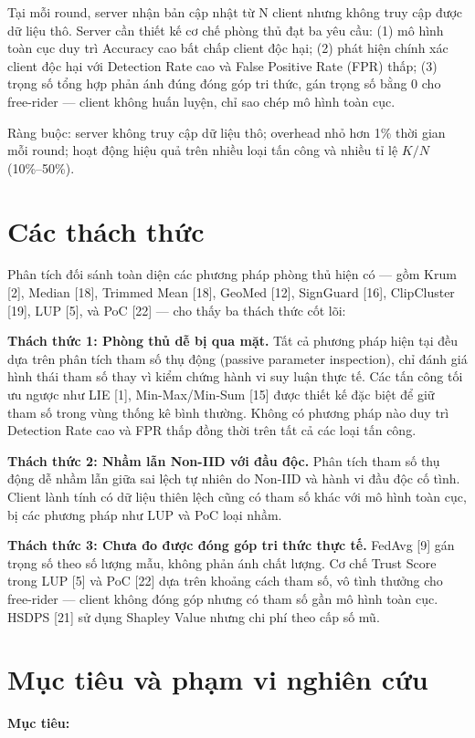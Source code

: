 Tại mỗi round, server nhận bản cập nhật từ N client nhưng không truy cập được dữ liệu thô. Server cần thiết kế cơ chế phòng thủ đạt ba yêu cầu: (1) mô hình toàn cục duy trì Accuracy cao bất chấp client độc hại; (2) phát hiện chính xác client độc hại với Detection Rate cao và False Positive Rate (FPR) thấp; (3) trọng số tổng hợp phản ánh đúng đóng góp tri thức, gán trọng số bằng 0 cho free-rider --- client không huấn luyện, chỉ sao chép mô hình toàn cục.

Ràng buộc: server không truy cập dữ liệu thô; overhead nhỏ hơn 1\% thời gian mỗi round; hoạt động hiệu quả trên nhiều loại tấn công và nhiều tỉ lệ $K/N$ (10\%--50\%).

\section{Các thách thức}
Phân tích đối sánh toàn diện các phương pháp phòng thủ hiện có --- gồm Krum {[}2{]}, Median {[}18{]}, Trimmed Mean {[}18{]}, GeoMed {[}12{]}, SignGuard {[}16{]}, ClipCluster {[}19{]}, LUP {[}5{]}, và PoC {[}22{]} --- cho thấy ba thách thức cốt lõi:

\textbf{Thách thức 1: Phòng thủ dễ bị qua mặt.} Tất cả phương pháp hiện tại đều dựa trên phân tích tham số thụ động (passive parameter inspection), chỉ đánh giá hình thái tham số thay vì kiểm chứng hành vi suy luận thực tế. Các tấn công tối ưu ngược như LIE {[}1{]}, Min-Max/Min-Sum {[}15{]} được thiết kế đặc biệt để giữ tham số trong vùng thống kê bình thường. Không có phương pháp nào duy trì Detection Rate cao và FPR thấp đồng thời trên tất cả các loại tấn công.

\textbf{Thách thức 2: Nhầm lẫn Non-IID với đầu độc.} Phân tích tham số thụ động dễ nhầm lẫn giữa sai lệch tự nhiên do Non-IID và hành vi đầu độc cố tình. Client lành tính có dữ liệu thiên lệch cũng có tham số khác với mô hình toàn cục, bị các phương pháp như LUP và PoC loại nhầm.

\textbf{Thách thức 3: Chưa đo được đóng góp tri thức thực tế.} FedAvg {[}9{]} gán trọng số theo số lượng mẫu, không phản ánh chất lượng. Cơ chế Trust Score trong LUP {[}5{]} và PoC {[}22{]} dựa trên khoảng cách tham số, vô tình thưởng cho free-rider --- client không đóng góp nhưng có tham số gần mô hình toàn cục. HSDPS {[}21{]} sử dụng Shapley Value nhưng chi phí theo cấp số mũ.

\section{Mục tiêu và phạm vi nghiên cứu}
\textbf{Mục tiêu:}

